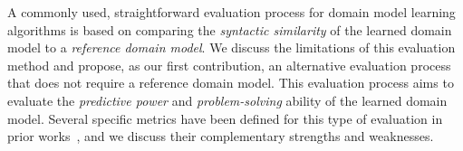\documentclass[letterpaper]{article} %
\begin{document}
A commonly used, straightforward evaluation process for domain model learning algorithms is based on comparing the \emph{syntactic similarity} of the learned domain model to a \emph{reference domain model}. 
We discuss the limitations of this evaluation method and propose, as our first contribution, an alternative evaluation process that does not require a reference domain model. 
This evaluation process aims to evaluate the \emph{predictive power} and \emph{problem-solving} ability of the learned domain model. 
Several specific metrics have been defined for this type of evaluation in prior works~\citep{aineto2019learning,juba2021safe,mordoch2024safe,Oswald2024DLLMDomainModeling}, and we discuss their complementary strengths and weaknesses. 
\end{document}
